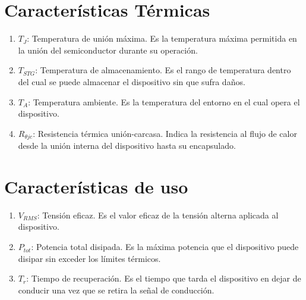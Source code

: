\documentclass[chaptersright]{informeutn}
\begin{document}
  \section*{Características Térmicas}
  
    \begin{enumerate}
        \item $T_J$: Temperatura de unión máxima. Es la temperatura máxima permitida en la unión del semiconductor durante su operación.
        \item $T_{STG}$: Temperatura de almacenamiento. Es el rango de temperatura dentro del cual se puede almacenar el dispositivo sin que sufra daños.
        \item $T_A$: Temperatura ambiente. Es la temperatura del entorno en el cual opera el dispositivo.
        \item $R_{\theta jc}$: Resistencia térmica unión-carcasa. Indica la resistencia al flujo de calor desde la unión interna del dispositivo hasta su encapsulado.
    \end{enumerate}
  
  \section*{Características de uso}
  
    \begin{enumerate}
        \item $V_{RMS}$: Tensión eficaz. Es el valor eficaz de la tensión alterna aplicada al dispositivo.
        \item $P_{tot}$: Potencia total disipada. Es la máxima potencia que el dispositivo puede disipar sin exceder los límites térmicos.
        \item $T_r$: Tiempo de recuperación. Es el tiempo que tarda el dispositivo en dejar de conducir una vez que se retira la señal de conducción.
    \end{enumerate}
\end{document}
